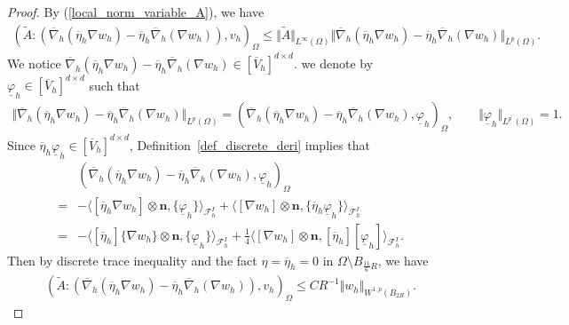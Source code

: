 \documentclass[12pt]{amsart}
\theoremstyle{definition}
\theoremstyle{remark}
\begin{document}
\begin{proof}
By (\ref{local_norm_variable_A}), we have 
\begin{align*}
(\tilde{A}:\left(\overline{\nabla}_{h}( \overline{\eta}_{h}  \nabla  w_{h}) 
- \overline{\eta}_{h}\overline{\nabla}_{h}( \nabla  w_{h})\right), v_{h})_{\Omega} 
\leq \Vert \tilde{A}\Vert_{L^{\infty}(\Omega)} 
\Vert \overline{\nabla}_{h}( \overline{\eta}_{h}  \nabla  w_{h}) 
- \overline{\eta}_{h}\overline{\nabla}_{h}( \nabla  w_{h})\Vert_{L^{p}(\Omega)}.
\end{align*}
We notice $\overline{\nabla}_{h}( \overline{\eta}_{h}  \nabla  w_{h}) 
- \overline{\eta}_{h}\overline{\nabla}_{h}( \nabla  w_{h}) \in [\overline{V}_{h}]^{d\times d}$. 
we denote by $\underline{\varphi}_{h} \in [\overline{V}_{h}]^{d \times d}$ such that 
\begin{align*}
\Vert \overline{\nabla}_{h}( \overline{\eta}_{h}  \nabla  w_{h}) 
- \overline{\eta}_{h}\overline{\nabla}_{h}( \nabla  w_{h})\Vert_{L^{p}(\Omega)} 
= \left(\overline{\nabla}_{h}( \overline{\eta}_{h}  \nabla  w_{h}) 
- \overline{\eta}_{h}\overline{\nabla}_{h}( \nabla  w_{h}), \underline{\varphi}_{h} \right)_{\Omega}, 
\qquad \Vert \underline{\varphi}_{h} \Vert_{L^{p^{\prime}}(\Omega)} = 1.
\end{align*}
Since $\overline{\eta}_{h}\underline{\varphi}_{h} \in [\overline{V}_{h}]^{d \times d}$, 
Definition~\ref{def_discrete_deri} implies that  
\begin{align*}
& \left(\overline{\nabla}_{h}( \overline{\eta}_{h}  \nabla  w_{h}) 
- \overline{\eta}_{h}\overline{\nabla}_{h}( \nabla  w_{h}), \underline{\varphi}_{h} \right)_{\Omega} \\
= & - \langle [\overline{\eta}_{h}  \nabla  w_{h}] \otimes \boldsymbol{n}, 
\{ \underline{\varphi}_{h} \} \rangle_{\mathcal{F}_{h}^{I}} 
+ \langle [\nabla  w_{h}] \otimes \boldsymbol{n}, 
\{ \overline{\eta}_{h} \underline{\varphi}_{h} \} \rangle_{\mathcal{F}_{h}^{I}} \\
= & - \langle [\overline{\eta}_{h}] \{ \nabla  w_{h}\} \otimes \boldsymbol{n}, 
\{ \underline{\varphi}_{h} \} \rangle_{\mathcal{F}_{h}^{I}} 
+ \frac{1}{4}\langle [\nabla  w_{h}] \otimes \boldsymbol{n}, 
[ \overline{\eta}_{h}] [\underline{\varphi}_{h} ] \rangle_{\mathcal{F}_{h}^{I}}.
\end{align*}
Then by discrete trace inequality and the fact
$\eta = \overline{\eta}_{h} = 0$ in $\Omega \setminus B_{\frac{11}{6}R}$, we have 
\begin{align}
\label{gloabl_estimate_with_reaction_ineq7}
(\tilde{A}:\left(\overline{\nabla}_{h}( \overline{\eta}_{h}  \nabla  w_{h}) 
- \overline{\eta}_{h}\overline{\nabla}_{h}( \nabla  w_{h})\right), v_{h})_{\Omega} 
\leq C R^{-1} \Vert w_{h}\Vert_{W^{1,p}(B_{2R})}.
\end{align}


\end{proof}
\end{document}

